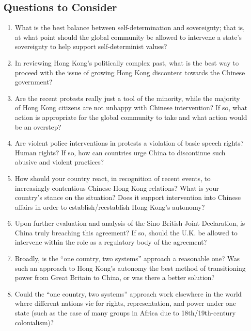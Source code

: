 \documentclass[10pt, letterpaper]{article}
\begin{document}
\subsection{{Questions to Consider}}

\begin{enumerate}
\def\labelenumi{\arabic{enumi}.}
\item
  
  What is the best balance between self-determination and sovereignty;
  that is, at what point should the global community be allowed to
  intervene a state's sovereignty to help support self-determinist
  values?
  
\item
  
  In reviewing Hong Kong's politically complex past, what is the best
  way to proceed with the issue of growing Hong Kong discontent towards
  the Chinese government?
  
\item
  
  Are the recent protests really just a tool of the minority, while the
  majority of Hong Kong citizens are not unhappy with Chinese
  intervention? If so, what action is appropriate for the global
  community to take and what action would be an overstep?
  
\item
  
  Are violent police interventions in protests a violation of basic
  speech rights? Human rights? If so, how can countries urge China to
  discontinue such abusive and violent practices?
  
\item
  
  How should your country react, in recognition of recent events, to
  increasingly contentious Chinese-Hong Kong relations? What is your
  country's stance on the situation? Does it support intervention into
  Chinese affairs in order to establish/reestablish Hong Kong's
  autonomy?
  
\item
  
  Upon further evaluation and analysis of the Sino-British Joint
  Declaration, is China truly breaching this agreement? If so, should
  the U.K. be allowed to intervene within the role as a regulatory body
  of the agreement?
  
\item
  
  Broadly, is the ``one country, two systems'' approach a reasonable
  one? Was such an approach to Hong Kong's autonomy the best method of
  transitioning power from Great Britain to China, or was there a better
  solution?
  
\item
  
  Could the ``one country, two systems'' approach work elsewhere in the
  world where different nations vie for rights, representation, and
  power under one state (such as the case of many groups in Africa due
  to 18th/19th-century colonialism)?
  
\end{enumerate}
\end{document}
